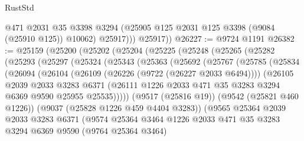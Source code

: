 \begin{lexlean}{RustStd}
\begin{coremodule}
              @471
              @2031
              @35
              @3398
              @3294
              (@25905 @125 @2031 @125 @3398 (@9084 (@25910 @125)) @10062)
              @25917)))
        @25917))
@26227 := @9724 @1191
@26382 := @25159
    (@25200
      (@25202
        (@25204
          (@25225
            (@25248
              (@25265
                (@25282
                  (@25293
                    (@25297
                      (@25324
                        (@25343
                          (@25363
                            (@25692
                              (@25767
                                (@25785
                                  (@25834
                                    (@26094
                                      (@26104
                                        (@26109 (@26226 (@9722 (@26227 @2033 @6494))))
                                        (@26105
                                          @2039
                                          @2033
                                          @3283
                                          @6371
                                          (@26111
                                            @1226
                                            @2033
                                            @471
                                            @35
                                            @3283
                                            @3294
                                            @6369
                                            @9590
                                            @25955
                                            @25535)))))
                                  (@9517 (@25816 @19))
                                  (@9542 (@25821 @460 @1226))
                                  (@9037 (@25828 @1226 @459 @4404 @3283))
                                  (@9565
                                    @25364
                                    @2039
                                    @2033
                                    @3283
                                    @6371
                                    (@9574
                                      @25364
                                      @3464
                                      @1226
                                      @2033
                                      @471
                                      @35
                                      @3283
                                      @3294
                                      @6369
                                      @9590
                                      (@9764 @25364 @3464)

\end{coremodule}
\end{lexlean}

